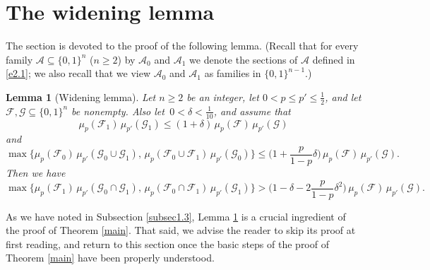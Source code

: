 \documentclass[10pt]{amsart}
\newtheorem{lem}[thm]{Lemma}
\theoremstyle{remark}
\newcommand{\meg}{\geqslant}
\newcommand{\mik}{\leqslant}
\newcommand{\Fcal}{\mathcal{F}}
\newcommand{\Gcal}{\mathcal{G}}
\newcommand{\Acal}{\mathcal{A}}
\begin{document}

\section{The widening lemma} \label{sec4}


The section is devoted to the proof of the following lemma. (Recall that for every family
$\mathcal{A}\subseteq \{0,1\}^n$ ($n\meg 2$) by $\Acal_0$ and $\Acal_1$ we denote the
sections of $\Acal$ defined in \eqref{e2.1}; we also recall that we view
$\mathcal{A}_0$ and $\mathcal{A}_1$ as families in $\{0,1\}^{n-1}$.)
\begin{lem}[Widening lemma] \label{l4.1}
Let $n\meg 2$ be an integer, let $0<p\mik p'\mik \frac12$, and let $\Fcal,\Gcal\subseteq \{0,1\}^n$
be nonempty. Also let\, $0<\delta<\frac{1}{10}$, and assume that
\begin{equation} \label{e4.1}
\mu_p(\Fcal_1)\,\mu_{p'}(\Gcal_1)  \mik (1+\delta)\, \mu_p(\Fcal)\,\mu_{p'}(\Gcal)
\end{equation}
and
\begin{equation} \label{e4.2}  \max\big\{ \mu_p(\Fcal_0)\, \mu_{p'}(\Gcal_0  \cup\Gcal_1), \,
\mu_p(\Fcal_0\cup\Fcal_1)\, \mu_{p'}(\Gcal_0) \big\}  \mik \Big(1+\frac{p}{1-p}\delta\Big)\,
\mu_p(\Fcal)\, \mu_{p'}(\Gcal).
\end{equation}
Then we have
\begin{equation} \label{e4.3}
\max\big\{ \mu_p(\Fcal_1)\,\mu_{p'}(\Gcal_0\cap\Gcal_1), \,
\mu_p(\Fcal_0\cap\Fcal_1)\,\mu_{p'}(\Gcal_1)\big\} >
\Big(1-\delta-2\frac{p}{1-p}\delta^2\Big)\, \mu_p(\Fcal)\, \mu_{p'}(\Gcal).
\end{equation}
\end{lem}
As we have noted in Subsection \ref{subsec1.3}, Lemma \ref{l4.1} is a crucial ingredient
of the proof of Theorem \ref{main}. That said, we advise the reader to skip its proof
at first reading, and return to this section once the basic steps of the proof
of Theorem \ref{main} have been properly understood.
\end{document}

